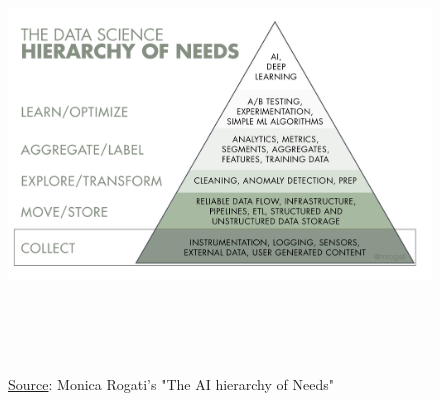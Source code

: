 \begin{figure}[h!]
  \centering
  \includegraphics[width=14cm,height=12cm,keepaspectratio]{../media/crawler/data_hierarchy.png}
  \caption{\underline{Source}: Monica Rogati's "The AI hierarchy of Needs"}
  \label{fig:datahierarchy}
\end{figure}

